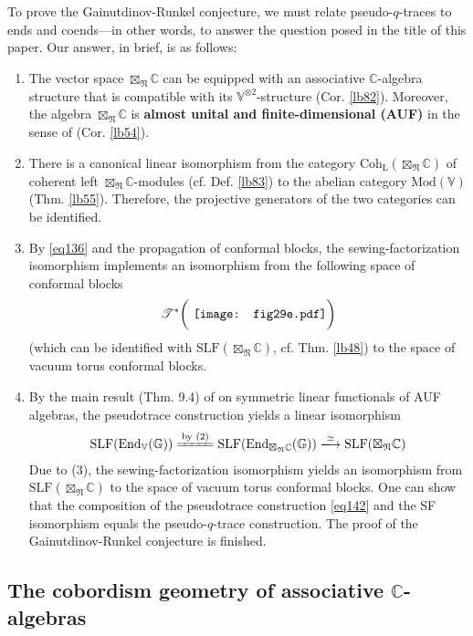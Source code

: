 \documentclass[11pt,b5paper,notitlepage]{article}
\theoremstyle{definition}
\theoremstyle{plain}
\newcommand{\End}{\mathrm{End}} %
\newcommand{\SLF}{\mathrm{SLF}}
\newcommand{\Vbb}{\mathbb V}
\newcommand{\Gbb}{\mathbb G}
\newcommand{\Cbb}{\mathbb C}
\newcommand{\<}{\left\langle}
\renewcommand{\>}{\right\rangle}
\newcommand{\ST}{\mathscr{T}}
\newcommand{\Mod}{\mathrm{Mod}}
\newcommand{\fn}{\mathfrak{N}}
\newcommand{\Coh}{{\mathrm{Coh}_{\mathrm L}}}
\numberwithin{equation}{section}
\begin{document}
To prove the Gainutdinov-Runkel conjecture, we must relate pseudo-$q$-traces to ends and coends---in other words, to answer the question posed in the title of this paper. Our answer, in brief, is as follows:
\begin{enumerate}[label=(\arabic*)]
\item The vector space $\boxtimes_\fn\Cbb$ can be equipped with an associative $\Cbb$-algebra structure that is compatible with its $\Vbb^{\otimes2}$-structure (Cor. \ref{lb82}). Moreover, the algebra $\boxtimes_\fn\Cbb$ is \textbf{almost unital and finite-dimensional (AUF)} in the sense of \cite{GZ4} (Cor. \ref{lb54}). 
\item There is a canonical linear isomorphism from the category $\Coh(\boxtimes_\fn\Cbb)$ of coherent left $\boxtimes_\fn\Cbb$-modules (cf. Def. \ref{lb83}) to the abelian category $\Mod(\Vbb)$ (Thm. \ref{lb55}). Therefore, the projective generators of the two categories can be identified.
\item By \eqref{eq136} and the propagation of conformal blocks, the sewing-factorization isomorphism implements an isomorphism from the following space of conformal blocks
\begin{align}
\ST^*\bigg(\vcenter{\hbox{{
		\texttt{[image: fig29e.pdf]}}}}\bigg)
\end{align}
(which can be identified with $\SLF(\boxtimes_\fn\Cbb)$, cf. Thm. \ref{lb48}) to the space of vacuum torus conformal blocks.
\item By the main result (Thm. 9.4) of \cite{GZ4} on symmetric linear functionals of AUF algebras, the pseudotrace construction yields a linear isomorphism
\begin{align}\label{eq142}
\SLF(\End_\Vbb(\Gbb))\xlongequal{\text{by (2)}}\SLF(\End_{\boxtimes_\fn\Cbb}(\Gbb))\xlongrightarrow{\simeq}\SLF(\boxtimes_\fn\Cbb)
\end{align}
Due to (3), the sewing-factorization isomorphism yields an isomorphism from $\SLF(\boxtimes_\fn\Cbb)$ to the space of vacuum torus conformal blocks. One can show that the composition of the pseudotrace construction \eqref{eq142} and the SF isomorphism equals the pseudo-$q$-trace construction. The proof of the Gainutdinov-Runkel conjecture is finished.
\end{enumerate}



\subsection{The cobordism geometry of associative $\Cbb$-algebras}
\end{document}
